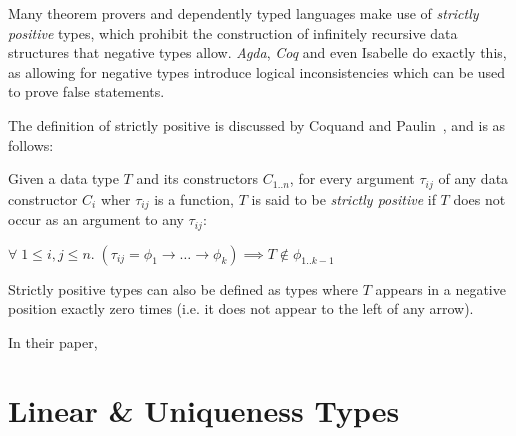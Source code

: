 Many theorem provers and dependently typed languages make use of \textit{strictly positive} types, which
prohibit the construction of infinitely recursive data structures that negative types allow.  
\textit{Agda}\citep{AgdaStrictlyPositive}, \textit{Coq}\citep{CoqStrictlyPositive} and even
Isabelle\citep{IsabelleStrictlyPositive} do exactly this, as allowing for negative types introduce logical
inconsistencies which can be used to prove false statements.

The definition of strictly positive is discussed by Coquand and Paulin~\cite{CoquandTypes}, and is as follows:

\theoremstyle{definition}
\begin{definition}
    \label{def:sp}
    Given a data type $T$ and its constructors $C_{1..n}$, for every argument $\tau_{ij}$
    of any data constructor $C_i$ wher $\tau_{ij}$ is a function, $T$ is said to be \textit{strictly positive} if 
    $T$ does not occur as an argument to any $\tau_{ij}$:

    \begin{center}
        $\forall\; 1 \leq i,j \leq n.\;
        (\tau_{ij} = \phi_{1} \rightarrow \dots \rightarrow \phi_{k})
        \implies T \notin \phi_{1..k-1}$
    \end{center}
\end{definition}

Strictly positive types can also be defined as types where $T$ appears in a negative position exactly zero times
(i.e. it does not appear to the left of any arrow).

In their paper, 

\section{Linear \& Uniqueness Types}

